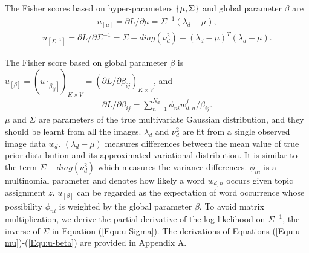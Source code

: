 \documentclass[journal]{IEEEtran}
\begin{document}
The Fisher scores based on hyper-parameters ${\rm{\{ }}\mu ,\Sigma {\rm{\} }}$ and global parameter $\beta$ are
\begin{equation} \label{Equ:u-mu}
\begin{aligned}
  {u_{[\mu ]}} = {{\partial L}}/{{\partial \mu }} = {\Sigma ^{ - 1}}({\lambda _d} - \mu ),
  \end{aligned}
\end{equation}
\begin{equation} \label{Equ:u-Sigma}
\begin{aligned}
    {u_{[\Sigma^{-1} ]}} = {{\partial L}}/{{\partial \Sigma ^{-1} }} = \Sigma - diag(\nu _d^2) - {({\lambda _d} - \mu )^T}({\lambda _d} - \mu ).
    \end{aligned}
\end{equation}

The Fisher score based on global parameter $\beta$ is ${u_{[\beta ]}} = {({u_{[{\beta _{ij}}]}})_{K \times V}} = {(\partial L/\partial {\beta _{ij}})_{K \times V}}$, and 
\begin{equation} \label{Equ:u-beta}
\begin{aligned}
  {\partial L/\partial {\beta _{ij}}} = \sum\limits_{n = 1}^{{N_d}} {{{{\phi _{ni}}w_{d,n}^j}}/{{{\beta _{ij}}}}}.
  \end{aligned}
\end{equation}
$\mu$ and $\Sigma$ are parameters of the true multivariate Gaussian distribution, and they should be learnt from all the images. ${\lambda _d}$ and $\nu _d^2$ are fit from a single observed image data ${w_d}$. $({\lambda _d} - \mu)$ measures differences between the mean value of true prior distribution and its approximated variational distribution. It is similar to the term $\Sigma - diag(\nu _d^2)$ which measures the variance differences. ${\phi _{ni}}$ is a multinomial parameter and denotes how likely a word ${w_{d,n}}$ occurs given topic assignment $z$. ${u_{[\beta ]}}$ can be regarded as the expectation of word occurrence whose possibility ${\phi _{ni}}$ is weighted by the global parameter $\beta$. To avoid matrix multiplication, we derive the partial derivative of the log-likelihood on $\Sigma^{-1}$, the inverse of $\Sigma$ in Equation (\ref{Equ:u-Sigma}). The derivations of Equations (\ref{Equ:u-mu})-(\ref{Equ:u-beta}) are provided in Appendix A.%
\end{document}
